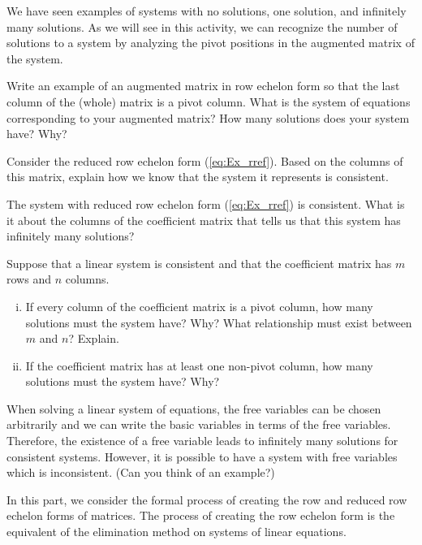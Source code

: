 \begin{activity} \label{act:1_c_2} We have seen examples of systems with no solutions, one solution, and infinitely many solutions. As we will see in this activity, we can recognize the number of solutions to a system by analyzing the pivot positions in the augmented matrix of the system.  
    \ba
    \item Write an example of an augmented matrix in row echelon form so that the last column of the (whole) matrix is a pivot column. What is the system of equations corresponding to your augmented matrix? How many solutions does your system have? Why? 
		

    \item Consider the reduced row echelon form (\ref{eq:Ex_rref}). Based on the columns of this matrix, explain how we know that the system it represents is consistent. 

	\item The system with reduced row echelon form (\ref{eq:Ex_rref}) is consistent. What is it about the columns of the coefficient matrix that tells us that this system has infinitely many solutions? 

     \item Suppose that a linear system is consistent and that the coefficient matrix has $m$ rows and $n$ columns. 
		\begin{enumerate}[i.]
		\item If every column of the coefficient matrix is a pivot column, how many solutions must the system have? Why? What relationship must exist between $m$ and $n$? Explain.
		\item If the coefficient matrix has at least one non-pivot column, how many solutions must the system have? Why? 
		\end{enumerate}

    \ea

\end{activity}


When solving a linear system of equations, the free variables can be chosen arbitrarily and we can write the basic variables in terms of the free variables. Therefore, the existence of a free variable leads to infinitely many solutions for consistent systems. However, it is possible to have a system with free variables which is inconsistent. (Can you think of an example?)

\label{sec:prod_ech_forms}

In this part, we consider the formal process of creating the row and reduced row echelon forms of matrices. The process of creating the row echelon form is the equivalent of the elimination method on systems of linear equations.

